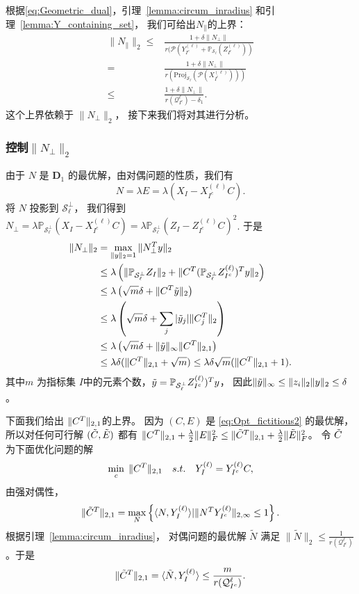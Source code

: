 \documentclass[main.tex]{subfiles}
\begin{document}
根据\eqref{eq:Geometric_dual}，引理~\ref{lemma:circum_inradius} 和引理~\ref{lemma:Y_containing_set}，
我们可给出$N_{\parallel}$的上界：
\begin{align}
  \|N_{\parallel}\|_2 \leq& \frac{1+\delta\|N_{\perp}\|}
  {r(\mathcal{P}(Y_{I^c}^{(\ell)}+\mathbb{P}_{\mathcal{S}_{\ell}}(Z_{I^c}^{(\ell)}))}
  \nonumber \\
  =& \frac{1+\delta\|N_{\perp}\|}{r(\mathrm{Proj}_\mathcal{S_{\ell}}
  (\mathcal{P}(X_{I^c}^{(\ell)})))} \nonumber \\
  \leq& \frac{1+\delta\|N_{\perp}\|}{r{\left( \mathcal{Q}_{I^c}^{\ell}\right)}-\delta_1}.\label{eq:nu1_bound}
\end{align}
这个上界依赖于 $\|N_{\perp}\|_2$， 接下来我们将对其进行分析。

\subsubsection{控制$\|N_{\perp}\|_2$}

由于 $N$ 是 $\mathbf{D}_1$ 的最优解，由对偶问题的性质，我们有
$$ N=\lambda E=\lambda(X_I-X^{(\ell)}_{I^c}C). $$
将 $N$ 投影到 $\mathcal{S}^{\perp}_{\ell}$， 我们得到
$N_{\perp}=\lambda \mathbb{P}_{\mathcal{S}_{\ell}^{\perp}}(X_I-X^{(\ell)}_{I^c}C)
= \lambda \mathbb{P}_{\mathcal{S}_{\ell}^{\perp}}(Z_I-Z^{(\ell)}_{I^c}C)^2$.
于是
\begin{align}
  \|N_{\perp}\|_2 & = \max_{\|y\|_2=1} \|N_{\perp}^T y\|_2 \nonumber \\
  & \leq\lambda \left(\|\mathbb{P}_{\mathcal{S}_{\ell}^{\perp}}Z_I\|_2
  +\|C^T (\mathbb{P}_{\mathcal{S}_{\ell}^{\perp}}Z^{(\ell)}_{I^c})^T y\|_2\right)\nonumber\\
  & \leq \lambda\left( \sqrt{m} \delta + \|C^T \tilde{y}\|_2\right) \nonumber\\
  & \leq \lambda\left( \sqrt{m} \delta + \sum_j |\tilde{y}_j|\|C^T_j\|_2\right) \nonumber\\
  & \leq \lambda\left( \sqrt{m} \delta + \|\tilde{y}\|_{\infty}\|C^T\|_{2,1}\right) \nonumber\\
  & \leq \lambda \delta(\|C^T\|_{2,1}+\sqrt{m}) \leq \lambda\delta\sqrt{m}(\|C^T\|_{2,1}+1). \label{eq:bounding_nu2}
\end{align}
其中$m$ 为指标集 $I$中的元素个数，$\tilde{y}=\mathbb{P}_{\mathcal{S}_{\ell}^{\perp}}Z^{(\ell)}_{I^c})^Ty$，
因此$\|\tilde{y}\|_{\infty} \leq \|z_i\|_2 \|y\|_2 \leq \delta$。

下面我们给出 $\|C^T\|_{2,1}$的上界。
因为 $(C,E)$ 是 \eqref{eq:Opt_fictitious2} 的最优解，所以对任何可行解 $(\tilde{C} ,\tilde{E})$
都有 $\|C^T\|_{2,1}+\frac{\lambda}{2}\|E\|^2_F \leq \|\tilde{C}^T\|_{2,1}+\frac{\lambda}{2}\|\tilde{E}\|_F^2$。
令 $\tilde{C}$ 为下面优化问题的解
\begin{align}\label{eq:Opt_y only}
\min_{c} \; \|C^T\|_{2,1} \quad
s.t. \quad Y^{(\ell)}_I=Y^{(\ell)}_{I^c}C,
\end{align}
由强对偶性，
$$\|\tilde{C}^T\|_{2,1} = \max_{N}\left\{\langle N,Y^{(\ell)}_I\rangle | \|N^T
Y^{(\ell)}_{I^c}\|_{2, \infty}\leq 1\right\}.$$
根据引理~\ref{lemma:circum_inradius}， 对偶问题的最优解 $\tilde{N}$ 满足
$\|\tilde{N}\|_2 \leq \frac{1}{r(\mathcal{Q}_{I^c}^{\ell})}$。于是
$$\|\tilde{C}^T\|_{2,1} = \langle\tilde{N},Y^{(\ell)}_I\rangle \leq \frac{m}{r(\mathcal{Q}_{I^c}^{\ell})}.$$
\end{document}
